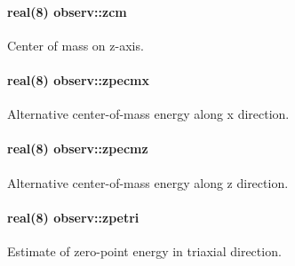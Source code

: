 \paragraph[{\texorpdfstring{zcm}{zcm}}]{\setlength{\rightskip}{0pt plus 5cm}real(8) observ\+::zcm}\hypertarget{namespaceobserv_a70ecabcf15034808b4bb9500d3826a79}{}\label{namespaceobserv_a70ecabcf15034808b4bb9500d3826a79}


Center of mass on z-\/axis. 

\paragraph[{\texorpdfstring{zpecmx}{zpecmx}}]{\setlength{\rightskip}{0pt plus 5cm}real(8) observ\+::zpecmx}\hypertarget{namespaceobserv_a25dc1a401a0a58fe28e5d78fa6ec4cb0}{}\label{namespaceobserv_a25dc1a401a0a58fe28e5d78fa6ec4cb0}


Alternative center-\/of-\/mass energy along x direction. 

\paragraph[{\texorpdfstring{zpecmz}{zpecmz}}]{\setlength{\rightskip}{0pt plus 5cm}real(8) observ\+::zpecmz}\hypertarget{namespaceobserv_a6343c5bd2b3a06e7c47357ce13c5620e}{}\label{namespaceobserv_a6343c5bd2b3a06e7c47357ce13c5620e}


Alternative center-\/of-\/mass energy along z direction. 

\paragraph[{\texorpdfstring{zpetri}{zpetri}}]{\setlength{\rightskip}{0pt plus 5cm}real(8) observ\+::zpetri}\hypertarget{namespaceobserv_a1edc329ee9e9a9e175b95c7537407759}{}\label{namespaceobserv_a1edc329ee9e9a9e175b95c7537407759}


Estimate of zero-\/point energy in triaxial direction. 

